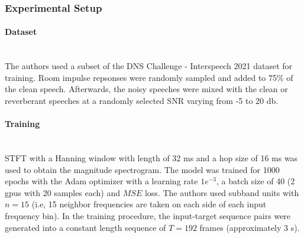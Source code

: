 \subsubsection{Experimental Setup}
\paragraph{Dataset}\mbox{}\\
The authors used a subset of the DNS Challenge - Interspeech 2021 dataset for training. Room impulse repsonses were randomly sampled and added to 75\% of the clean speech.
Afterwards, the noisy speeches were mixed with the clean or reverberant speeches at a randomly selected SNR varying from -5 to 20 db.

\paragraph{Training}\mbox{}\\
STFT with a Hanning window with length of 32 ms and a hop size of 16 ms was used to obtain the magnitude spectrogram.
The model was trained for 1000 epochs with the Adam optimizer with a learning rate $1e^{-3}$, a batch size of 40 (2 gpus with 20 samples each) and $MSE$ loss.
The authors used subband units with $n = 15$ (i.e, 15 neighbor frequencies are taken on each side of each input frequency bin).
In the training procedure, the input-target sequence pairs were generated into a constant length sequence of $T = 192$ frames (approximately 3 s).




